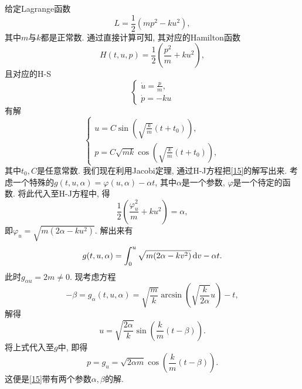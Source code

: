 \begin{example}[简谐振动]
    给定Lagrange函数 
    \begin{equation*}
        L= \frac{1}{2}(mp^2 - ku^2),
    \end{equation*}
    其中$m$与$k$都是正常数. 通过直接计算可知, 其对应的Hamilton函数 
    \begin{equation*}
        H(t, u, p) = \frac{1}{2}\left(\frac{p^2}{m} + ku^2\right), 
    \end{equation*}
    且对应的H-S 
    \begin{equation}\label{15}
        \begin{cases} 
            \displaystyle\dot u = \frac{p}{m}, \\  
            \dot p = -ku 
        \end{cases}
    \end{equation}
    有解
    \begin{equation*}
        \begin{cases} 
            \displaystyle u = C\sin\left(\sqrt{\frac{k}{m}}(t + t_0)\right), \\  
            \displaystyle p = C\sqrt{mk}\cos\left(\sqrt{\frac{k}{m}}(t + t_0)\right), 
        \end{cases}
    \end{equation*}
    其中$t_0, C$是任意常数. 我们现在利用Jacobi定理, 通过H-J方程把\eqref{15}的解写出来.
    考虑一个特殊的$g(t, u, \alpha) = \varphi(u, \alpha) - \alpha t$, 其中$\alpha$是一个参数, $\varphi$是一个待定的函数.
    将此代入至H-J方程中, 得
    \begin{equation*}
        \frac{1}{2}\left(\frac{\varphi_u^2}{m} + ku^2\right) = \alpha,
    \end{equation*} 
    即$\varphi_u = \sqrt{m(2\alpha - ku^2)}$. 解出来有 
    \begin{equation*}
        g(t, u, \alpha) = \int_0^u\sqrt{m(2\alpha - kv^2)} \,{\rm d}v - \alpha t.
    \end{equation*}
    此时$g_{\alpha u} = 2m \neq 0$. 现考虑方程 
    \begin{equation*}
        -\beta = g_{\alpha}(t, u, \alpha) = \sqrt{\frac{m}{k}}\arcsin\left(\sqrt{\frac{k}{2\alpha}}u\right) - t,
    \end{equation*}
    解得 
    \begin{equation*}
        u = \sqrt{\frac{2\alpha}{k}}\sin\left(\frac{k}{m}(t - \beta)\right). 
    \end{equation*}
    将上式代入至$g$中, 即得 
    \begin{equation*}
        p = g_u = \sqrt{2\alpha m}\cos\left(\frac{k}{m}(t - \beta)\right).
    \end{equation*}
    这便是\eqref{15}带有两个参数$\alpha, \beta$的解.
\end{example}
